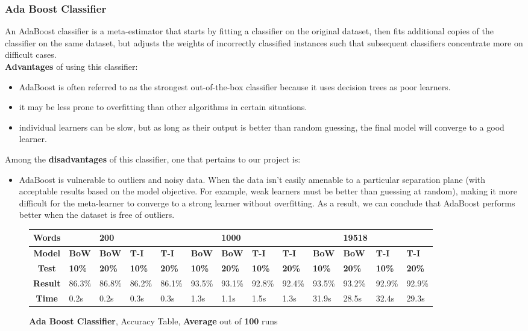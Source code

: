 \documentclass{article}
\begin{document}
	\subsubsection{Ada Boost Classifier}
	An AdaBoost classifier is a meta-estimator that starts by fitting a classifier on the original dataset, then 
fits additional copies of the classifier on the same dataset, but adjusts the weights of incorrectly classified 
instances such that subsequent classifiers concentrate more on difficult cases. \\
\textbf{Advantages} of using this classifier:
\begin{itemize}
\item AdaBoost is often referred to as the strongest out-of-the-box classifier because it uses decision trees as poor learners.
\item it may be less prone to overfitting than other algorithms in certain situations.
\item individual learners can be slow, but as long as their output is better than random guessing, the final model will converge to a good learner.
\end{itemize}

Among the \textbf{disadvantages} of this classifier, one that pertains to our project is:
\begin{itemize}
\item AdaBoost is vulnerable to outliers and noisy data.
When the data isn't easily amenable to a particular separation plane (with acceptable results based on the model objective. 
For example, weak learners must be better than guessing at random), making it more difficult for the meta-learner to converge to a strong learner without overfitting.
As a result, we can conclude that AdaBoost performs better when the dataset is free of outliers.
\end{itemize}
	\begin{figure}[H]
		\begin{tabular}{||c||l|l|l|l||l|l|l|l||l|l|l|l||}
			\hline
			\textbf{Words} &  & \textbf{200} & & & &\textbf{1000} & & & & \textbf{19518} &  & \\ \hline 
			\textbf{Model} & \textbf{BoW} & \textbf{BoW} & \textbf{T-I} & \textbf{T-I} &\textbf{BoW} & \textbf{BoW} & \textbf{T-I} & \textbf{T-I} & \textbf{BoW} & \textbf{BoW} & \textbf{T-I} & \textbf{T-I}\\ \hline
			\textbf{Test} & \textbf{10\%} & \textbf{20\%} & \textbf{10\%} & \textbf{20\%} & \textbf{10\%} & \textbf{20\%} & \textbf{10\%} & \textbf{20\%} & \textbf{10\%} & \textbf{20\%} & \textbf{10\%} & \textbf{20\%} \\ \hline \hline  
			\textbf{Result} & 86.3\% & 86.8\% & 86.2\% & 86.1\% & 93.5\% & 93.1\% & 92.8\% & 92.4\% & 93.5\% & 93.2\% & 92.9\% & 92.9\% \\ \hline 
			\textbf{Time} &0.2s & 0.2s & 0.3s & 0.3s & 1.3s & 1.1s & 1.5s & 1.3s &31.9s & 28.5s & 32.4s & 29.3s \\ \hline 
		\end{tabular}
		\caption{\textbf{Ada Boost Classifier}, Accuracy Table, \textbf{Average} out of \textbf{100} runs}
	\end{figure}
	
\end{document}
